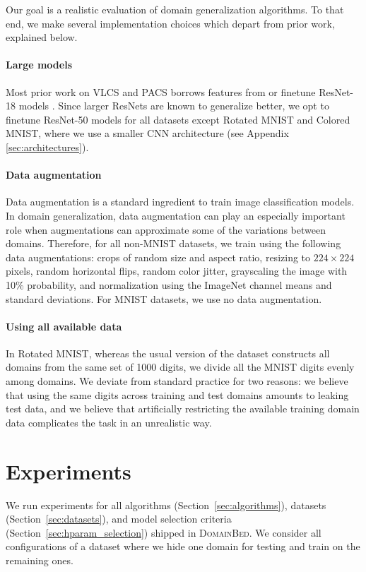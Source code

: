 \documentclass{article}
\newcommand{\domainbed}{\textsc{DomainBed}\xspace}
\begin{document}
Our goal is a realistic evaluation of domain generalization algorithms.
%
To that end, we make several implementation choices which depart from prior work, explained below.

\paragraph{Large models}
Most prior work on VLCS and PACS borrows features from or finetune ResNet-18 models \citep{He_2016_CVPR}.
%
Since larger ResNets are known to generalize better, we opt to finetune ResNet-50 models for all datasets except Rotated MNIST and Colored MNIST, where we use a smaller CNN architecture (see Appendix \ref{sec:architectures}).

\paragraph{Data augmentation}
Data augmentation is a standard ingredient to train image classification models.
%
In domain generalization, data augmentation can play an especially important role when augmentations can approximate some of the variations between domains.
%
Therefore, for all non-MNIST datasets, we train using the following data augmentations:
crops of random size and aspect ratio, resizing to $224 \times 224$ pixels, random horizontal flips, random color jitter, grayscaling the image with 10\% probability, and normalization using the ImageNet channel means and standard deviations.
%
For MNIST datasets, we use no data augmentation.

\paragraph{Using all available data}
In Rotated MNIST, whereas the usual version of the dataset constructs all domains from the same set of 1000 digits, we divide all the MNIST digits evenly among domains.
We deviate from standard practice for two reasons: we believe that using the same digits across training and test domains amounts to leaking test data, and we believe that artificially restricting the available training domain data complicates the task in an unrealistic way.

\section{Experiments}
\label{sec:experiments}

We run experiments for all algorithms (Section~\ref{sec:algorithms}), datasets (Section~\ref{sec:datasets}), and model selection criteria (Section~\ref{sec:hparam_selection}) shipped in \domainbed.
%
We consider all configurations of a dataset where we hide one domain for testing and train on the remaining ones.
\end{document}
